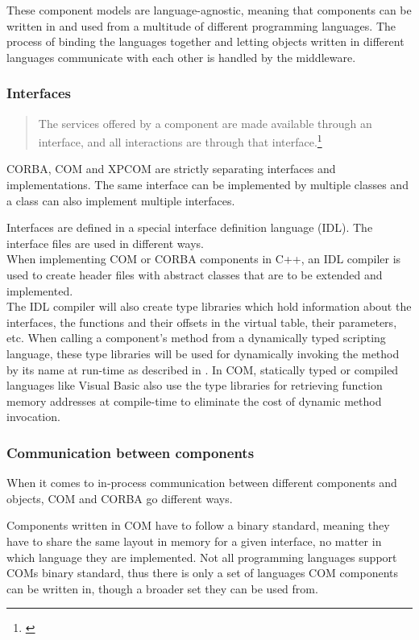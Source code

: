 These component models are language-agnostic, meaning that components can be written in and used from a multitude of different programming languages. The process of binding the languages together and letting objects written in different languages communicate with each other is handled by the middleware.

\subsubsection{Interfaces}

\begin{quotation}
The services offered by a component are made available through an interface, and all interactions are through that interface.\footnote{\citep[444]{Sommerville}}
\end{quotation}

CORBA, COM and XPCOM are strictly separating interfaces and implementations. The same interface can be implemented by multiple classes and a class can also implement multiple interfaces.

Interfaces are defined in a special interface definition language (IDL). The interface files are used in different ways.\\
When implementing COM or CORBA components in C++, an IDL compiler is used to create header files with abstract classes that are to be extended and implemented.\\
The IDL compiler will also create type libraries which hold information about the interfaces, the functions and their offsets in the virtual table, their parameters, etc. When calling a component's method from a dynamically typed scripting language, these type libraries will be used for dynamically invoking the method by its name at run-time as described in . In COM, statically typed or compiled languages like Visual Basic also use the type libraries for retrieving function memory addresses at compile-time to eliminate the cost of dynamic method invocation.  

\subsubsection{Communication between components}

When it comes to in-process communication between different components and objects, COM and CORBA go different ways. 

Components written in COM have to follow a binary standard, meaning they have to share the same layout in memory for a given interface, no matter in which language they are implemented. Not all programming languages support COMs binary standard, thus there is only a set of languages COM components can be written in, though a broader set they can be used from.

